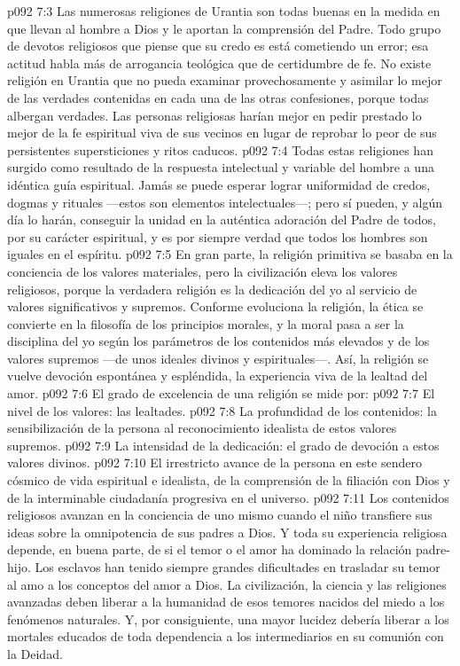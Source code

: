\vs p092 7:3 Las numerosas religiones de Urantia son todas buenas en la medida en que llevan al hombre a Dios y le aportan la comprensión del Padre. Todo grupo de devotos religiosos que piense que su credo es  está cometiendo un error; esa actitud habla más de arrogancia teológica que de certidumbre de fe. No existe religión en Urantia que no pueda examinar provechosamente y asimilar lo mejor de las verdades contenidas en cada una de las otras confesiones, porque todas albergan verdades. Las personas religiosas harían mejor en pedir prestado lo mejor de la fe espiritual viva de sus vecinos en lugar de reprobar lo peor de sus persistentes supersticiones y ritos caducos.
\vs p092 7:4 Todas estas religiones han surgido como resultado de la respuesta intelectual y variable del hombre a una idéntica guía espiritual. Jamás se puede esperar lograr uniformidad de credos, dogmas y rituales ---estos son elementos intelectuales---; pero sí pueden, y algún día lo harán, conseguir la unidad en la auténtica adoración del Padre de todos, por su carácter espiritual, y es por siempre verdad que todos los hombres son iguales en el espíritu.
\vs p092 7:5 \pc En gran parte, la religión primitiva se basaba en la conciencia de los valores materiales, pero la civilización eleva los valores religiosos, porque la verdadera religión es la dedicación del yo al servicio de valores significativos y supremos. Conforme evoluciona la religión, la ética se convierte en la filosofía de los principios morales, y la moral pasa a ser la disciplina del yo según los parámetros de los contenidos más elevados y de los valores supremos ---de unos ideales divinos y espirituales---. Así, la religión se vuelve devoción espontánea y espléndida, la experiencia viva de la lealtad del amor.
\vs p092 7:6 El grado de excelencia de una religión se mide por:
\vs p092 7:7 El nivel de los valores: las lealtades.
\vs p092 7:8 La profundidad de los contenidos: la sensibilización de la persona al reconocimiento idealista de estos valores supremos.
\vs p092 7:9 La intensidad de la dedicación: el grado de devoción a estos valores divinos.
\vs p092 7:10 El irrestricto avance de la persona en este sendero cósmico de vida espiritual e idealista, de la comprensión de la filiación con Dios y de la interminable ciudadanía progresiva en el universo.
\vs p092 7:11 \pc Los contenidos religiosos avanzan en la conciencia de uno mismo cuando el niño transfiere sus ideas sobre la omnipotencia de sus padres a Dios. Y toda su experiencia religiosa depende, en buena parte, de si el temor o el amor ha dominado la relación padre\hyp{}hijo. Los esclavos han tenido siempre grandes dificultades en trasladar su temor al amo a los conceptos del amor a Dios. La civilización, la ciencia y las religiones avanzadas deben liberar a la humanidad de esos temores nacidos del miedo a los fenómenos naturales. Y, por consiguiente, una mayor lucidez debería liberar a los mortales educados de toda dependencia a los intermediarios en su comunión con la Deidad.
